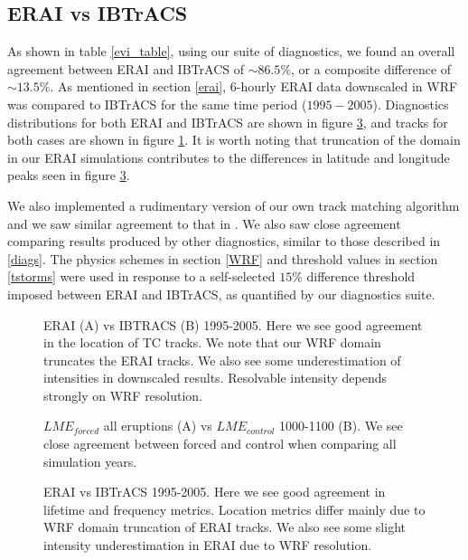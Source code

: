 \subsection{ERAI vs IBTrACS}
As shown in table \ref{evi_table}, using our suite of diagnostics, we found an overall agreement between ERAI and IBTrACS of ${\sim}86.5\%$, or a composite difference of ${\sim}13.5\%$. As mentioned in section \ref{erai}, $6$-hourly ERAI data downscaled in WRF was compared to IBTrACS for the same time period ($1995-2005$). Diagnostics distributions for both ERAI and IBTrACS are shown in figure \ref{evi_diags}, and tracks for both cases are shown in figure \ref{erai_ibtracs_tracks}. It is worth noting that truncation of the domain in our ERAI simulations contributes to the differences in latitude and longitude peaks seen in figure \ref{evi_diags}.  
\par
We also implemented a rudimentary version of our own track matching algorithm and we saw similar agreement to that in \cite{tc_reanal:1}. We also saw close agreement comparing results produced by other diagnostics, similar to those described in \ref{diags}. The physics schemes in section \ref{WRF} and threshold values in section \ref{tstorms} were used in response to a self-selected $15\%$ difference threshold imposed between ERAI and IBTrACS, as quantified by our diagnostics suite. 

\begin{figure}[!tbp]
\centering
\caption{ERAI (A) vs IBTRACS (B) 1995-2005. Here we see good agreement in the location of TC tracks. We note that our WRF domain truncates the ERAI tracks. We also see some underestimation of intensities in downscaled results. Resolvable intensity depends strongly on WRF resolution.}
\label{erai_ibtracs_tracks}
\end{figure}


\begin{figure}[!tbp]
\centering
\caption{$LME_{forced}$ all eruptions (A) vs $LME_{control}$ 1000-1100 (B). We see close agreement between forced and control when comparing all simulation years.}
\label{forced_ctrl_tracks}
\end{figure}

\begin{figure}[!tbp]
\centering
\caption{ERAI vs IBTrACS 1995-2005. Here we see good agreement in lifetime and frequency metrics. Location metrics differ mainly due to WRF domain truncation of ERAI tracks. We also see some slight intensity underestimation in ERAI due to WRF resolution.}
\label{evi_diags}
\end{figure}


